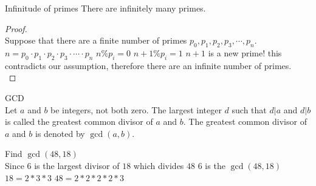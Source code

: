 \begin{thm}{Infinitude of primes} 
There are infinitely many primes.
\begin{proof}
$ $\\
\vspace{1cm}
Suppose that there are a finite number of primes $p_0,p_1,p_2,p_3,\cdots,p_n$.
\newline
$n=p_0\cdot p_1\cdot p_2 \cdot p_3 \cdot\cdots\cdot p_n$
\newline
$n\% p_i=0$
\newline
$n+1\% p_i=1$
\newline
$n+1$ is a new prime! this contradicts our assumption, therefore there are an infinite number of primes.
$ $\\
\end{proof}
\end{thm}
\begin{defn}{GCD}$ $\\
Let $a$ and $b$ be integers, not both zero. The largest integer $d$ such that $d | a$ and $d | b$ is called the greatest common divisor of $a$ and $b$. The greatest common divisor of $a$ and $b$ is denoted by $\gcd(a, b)$.
\end{defn}
\begin{exmp}Find $\gcd(48, 18)$
$ $\\
Since 6 is the largest divisor of $18$ which divides $48$ 6 is the $\gcd(48,18)$
\vspace{0.5em}
\noindent
$18=2*3*3$\newline
$48=2*2*2*2*3$
\end{exmp}


